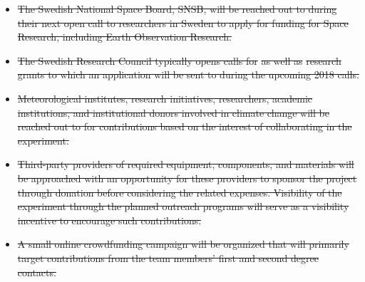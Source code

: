 \documentclass[a4paper,12pt,twoside, final]{article}
\providecommand{\DIFdeltex}[1]{{\protect\color{red}\sout{#1}}}                      %
\providecommand{\DIFdel}[1]{\texorpdfstring{\DIFdeltex{#1}}{}} %
\begin{document}
\begin{itemize}%
\item%
\DIFdel{The Swedish National Space Board, SNSB, will be reached out to during their next open call to researchers in Sweden to apply for funding for Space Research, including Earth Observation Research. }%
\item%
\DIFdel{The Swedish Research Council typically opens calls for }%
\DIFdel{as well as }%
\DIFdel{research grants to which an application will be sent to during the upcoming 2018 calls. }%
\item%
\DIFdel{Meteorological institutes, research initiatives, researchers, academic institutions, and institutional donors involved in climate change will be reached out to for contributions based on the interest of collaborating in the experiment. }%
\item%
\DIFdel{Third-party providers of required equipment, components, and materials will be approached with an opportunity for these providers to sponsor the project through donation before considering the related expenses. 
Visibility of the experiment through the planned outreach programs will serve as a visibility incentive to encourage such contributions.
    }%
\item%
\DIFdel{A small online crowdfunding campaign will be organized that will primarily target contributions from the team members' first and second degree contacts.
}
\end{itemize}%
\end{document}
